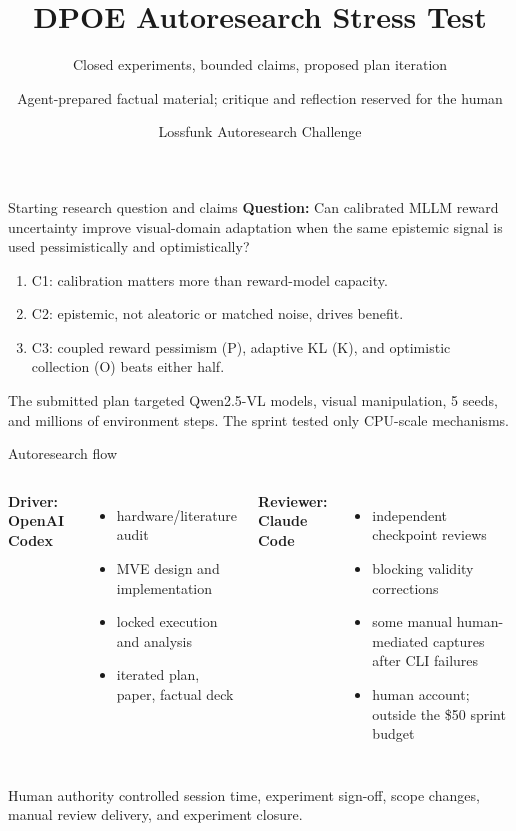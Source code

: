 \documentclass[aspectratio=169,10pt]{beamer}
\title{DPOE Autoresearch Stress Test}
\subtitle{Closed experiments, bounded claims, proposed plan iteration}
\author{Agent-prepared factual material; critique and reflection reserved for the human}
\date{Lossfunk Autoresearch Challenge}
\begin{document}
\begin{frame}
  \titlepage
\end{frame}

\begin{frame}{Starting research question and claims}
\textbf{Question:} Can calibrated MLLM reward uncertainty improve visual-domain adaptation when the same epistemic signal is used pessimistically and optimistically?
\begin{enumerate}
  \item C1: calibration matters more than reward-model capacity.
  \item C2: epistemic, not aleatoric or matched noise, drives benefit.
  \item C3: coupled reward pessimism (P), adaptive KL (K), and optimistic collection (O) beats either half.
\end{enumerate}
The submitted plan targeted Qwen2.5-VL models, visual manipulation, 5 seeds, and millions of environment steps. The sprint tested only CPU-scale mechanisms.
\end{frame}

\begin{frame}{Autoresearch flow}
\begin{columns}[T]
\textbf{Driver: OpenAI Codex}
\begin{itemize}
  \item hardware/literature audit
  \item MVE design and implementation
  \item locked execution and analysis
  \item iterated plan, paper, factual deck
\end{itemize}
\textbf{Reviewer: Claude Code}
\begin{itemize}
  \item independent checkpoint reviews
  \item blocking validity corrections
  \item some manual human-mediated captures after CLI failures
  \item human account; outside the \$50 sprint budget
\end{itemize}
\end{columns}
\vspace{0.5em}
Human authority controlled session time, experiment sign-off, scope changes, manual review delivery, and experiment closure.
\end{frame}
\end{document}
